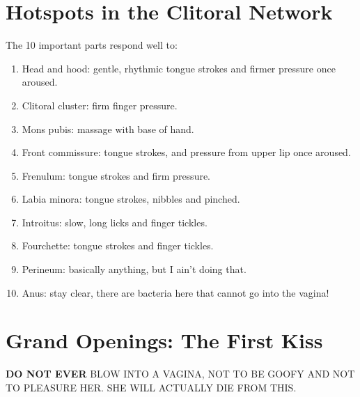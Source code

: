 \section{Hotspots in the Clitoral Network}
The 10 important parts respond well to:
\begin{enumerate}
	\item Head and hood: gentle, rhythmic tongue strokes and firmer pressure once aroused.
	\item Clitoral cluster: firm finger pressure.
	\item Mons pubis: massage with base of hand.
	\item Front commissure: tongue strokes, and pressure from upper lip once aroused.
	\item Frenulum: tongue strokes and firm pressure.
	\item Labia minora: tongue strokes, nibbles and pinched.
	\item Introitus: slow, long licks and finger tickles.
	\item Fourchette: tongue strokes and finger tickles.
	\item Perineum: basically anything, but I ain't doing that.
	\item Anus: stay clear, there are bacteria here that cannot go into the vagina!
\end{enumerate}

\section{Grand Openings: The First Kiss}
\begin{mdframed}
\textbf{DO NOT EVER} BLOW INTO A VAGINA, NOT TO BE GOOFY AND NOT TO PLEASURE HER. SHE WILL ACTUALLY DIE FROM THIS.
\end{mdframed}

